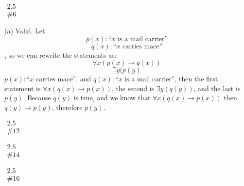 \documentclass{article}
\newcommand{\problem}[2]{$\boxed{\begin{array}{l}\text{#1} \\ \text{\##2}\end{array}}$}
\newcommand{\subproblem}[1]{(#1)}
\begin{document}
\begin{multicols*}{2}

\problem{2.5}{6}

\subproblem{a} Valid. Let \[
p(x):\text{``$x$ is a mail carrier''}
\] \[
q(x):\text{``$x$ carries mace''}
\], so we can rewrite the statements as: \[
\forall x(p(x)\rightarrow q(x))
\] \[
\exists y(p(y)
\]
 $p(x):\text{``$x$ carries mace''}$, and
$q(x):\text{``$x$ is a mail carrier''}$, then the first statement is
$\forall{}x(q(x)\rightarrow{}p(x))$, the second is $\exists{}y(q(y))$,
and the last is $p(y)$. Because $q(y)$ is true, and we know that
$\forall{}x(q(x)\rightarrow{}p(x))$ then $q(y)\rightarrow{}p(y)$,
therefore $p(y)$.

%

\problem{2.5}{12}

%

\problem{2.5}{14}

%

\problem{2.5}{16}

\end{multicols*}
\end{document}
